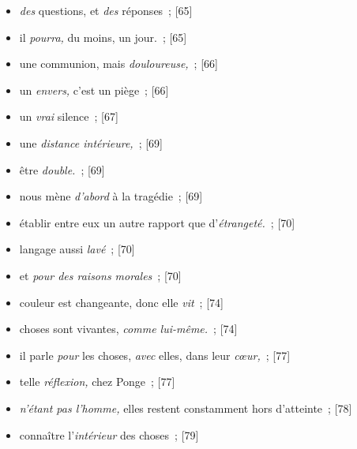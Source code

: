 \documentclass[12pt, a4paper]{article}
\begin{document}
\begin{itemize}
    \item \textit{des} questions, et \textit{des} réponses{\color{gray}~; [65]}

    \item il \textit{pourra,} du moins, un jour.{\color{gray}~; [65]}

    \item une communion, mais \textit{douloureuse,}{\color{gray}~; [66]}

    \item un \textit{envers,} c’est un piège{\color{gray}~; [66]}

    \item un \textit{vrai} silence{\color{gray}~; [67]}

    \item une \textit{distance intérieure,}{\color{gray}~; [69]}

    \item être \textit{double.}{\color{gray}~; [69]}

    \item nous mène \textit{d’abord} à la tragédie{\color{gray}~; [69]}

    \item établir entre eux un autre rapport que d’\textit{étrangeté.}{\color{gray}~; [70]}

    \item langage aussi \textit{lavé}{\color{gray}~; [70]}

    \item et \textit{pour des raisons morales}{\color{gray}~; [70]}

    \item couleur est changeante, donc elle \textit{vit}{\color{gray}~; [74]}

    \item choses sont vivantes, \textit{comme lui-même.}{\color{gray}~; [74]}

    \item il parle \textit{pour }les choses, \textit{avec} elles, dans leur \textit{cœur,}{\color{gray}~; [77]}

    \item telle \textit{réflexion,} chez Ponge{\color{gray}~; [77]}

    \item \textit{n’étant pas l’homme,} elles restent constamment hors d’atteinte{\color{gray}~; [78]}

    \item connaître l’\textit{intérieur} des choses{\color{gray}~; [79]}


\end{itemize}
\end{document}
